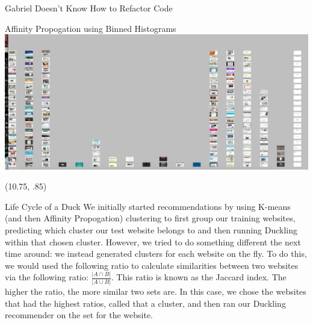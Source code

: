 \documentclass[7pt]{beamer}
\begin{document}
\begin{frame}{\centerline{\Huge Gabriel Doesn't Know How to Refactor Code}}
\begin{textblock}{5}
\begin{block}{Affinity Propogation using Binned Histograms}
\includegraphics[scale=.5]{binAffProp.jpg}
\end{block}
\end{textblock}

\begin{textblock}{5}(10.75, .85)
\begin{block}{Life Cycle of a Duck}
We initially started recommendations by using K-means (and then Affinity Propogation) clustering to first group our training websites, predicting which cluster our test website belongs to and then running Duckling within that chosen cluster. However, we tried to do something different the next time around: we instead generated clusters for each website on the fly. To do this, we would used the following ratio to calculate similarities between two websites via the following ratio: $\frac{|A \cap B|}{|A \cup B|}$. This ratio is known as the Jaccard index. The higher the ratio, the more similar two sets are. In this case, we chose the websites that had the highest ratios, called that a cluster, and then ran our Duckling recommender on the set for the website.
\end{block}
\end{textblock}
\end{frame}
\end{document}
